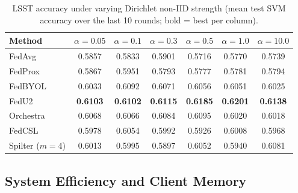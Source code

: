 \documentclass[sigconf]{acmart}
\begin{document}
\begin{table}[t]
  \centering
  \caption{LSST accuracy under varying Dirichlet non-IID strength (mean test SVM
  accuracy over the last 10 rounds; bold = best per column).}
  \label{tab:lsst_dirichlet}
  \begin{tabular}{lcccccc}
    \toprule
    Method & $\alpha{=}0.05$ & $\alpha{=}0.1$ & $\alpha{=}0.3$ & $\alpha{=}0.5$ & $\alpha{=}1.0$ & $\alpha{=}10.0$ \\
    \midrule
    FedAvg            & 0.5857 & 0.5833 & 0.5901 & 0.5716 & 0.5770 & 0.5739 \\
    FedProx           & 0.5867 & 0.5951 & 0.5793 & 0.5777 & 0.5781 & 0.5794 \\
    FedBYOL           & 0.6033 & 0.6092 & 0.6071 & 0.6056 & 0.6051 & 0.6025 \\
    FedU2             & \textbf{0.6103} & \textbf{0.6102} & \textbf{0.6115} & \textbf{0.6185} & \textbf{0.6201} & \textbf{0.6138} \\
    Orchestra         & 0.6068 & 0.6066 & 0.6084 & 0.6095 & 0.6020 & 0.6018 \\
    FedCSL            & 0.5978 & 0.6054 & 0.5992 & 0.5926 & 0.6008 & 0.5968 \\
    \midrule
    Spilter ($m{=}4$) & 0.6013 & 0.5995 & 0.5897 & 0.6052 & 0.5940 & 0.6081 \\
    \bottomrule
  \end{tabular}
\end{table}

\begin{table}[t]
  \centering
  \caption{Module ablation on Epilepsy, HAR, and SleepEDF (mean test SVM
  accuracy).}
  \label{tab:ablation}
\end{table}

\subsection{System Efficiency and Client Memory}
\label{sec:efficiency}
\end{document}
